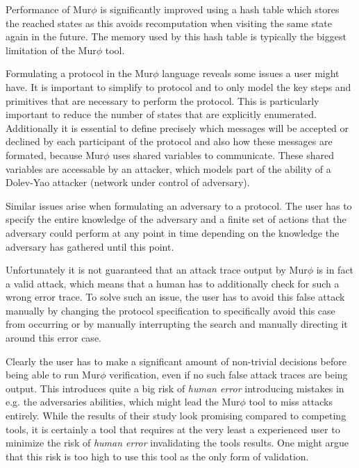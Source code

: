 \documentclass[a4paper,UKenglish]{lipics-v2018}
\def\murphi{Mur$\phi$ }
\begin{document}
Performance of \murphi is significantly improved using a hash table which stores the reached states as this avoids recomputation when visiting the same state again in the future. The memory used by this hash table is typically the biggest limitation of the \murphi tool.\cite{murphi}

Formulating a protocol in the \murphi language reveals some issues a user might have. It is important to simplify to protocol and to only model the key steps and primitives that are necessary to perform the protocol. This is particularly important to reduce the number of states that are explicitly enumerated. Additionally it is essential to define precisely which messages will be accepted or declined by each participant of the protocol and also how these messages are formated, because \murphi uses shared variables to communicate. These shared variables are accessable by an attacker, which models part of the ability of a Dolev-Yao attacker (network under control of adversary).\cite{murphi}

Similar issues arise when formulating an adversary to a protocol. The user has to specify the entire knowledge of the adversary and a finite set of actions that the adversary could perform at any point in time depending on the knowledge the adversary has gathered until this point.\cite{murphi}

Unfortunately it is not guaranteed that an attack trace output by \murphi is in fact a valid attack, which means that a human has to additionally check for such a wrong error trace. To solve such an issue, the user has to avoid this false attack manually by changing the protocol specification to specifically avoid this case from occurring or by manually interrupting the search and manually directing it around this error case.

Clearly the user has to make a significant amount of non-trivial decisions before being able to run \murphi verification, even if no such false attack traces are being output. This introduces quite a big risk of \textit{human error} introducing mistakes in e.g. the adversaries abilities, which might lead the \murphi tool to miss attacks entirely. While the results of their study look promising compared to competing tools, it is certainly a tool that requires at the very least a experienced user to minimize the risk of \textit{human error} invalidating the tools results. One might argue that this risk is too high to use this tool as the only form of validation.
\end{document}
